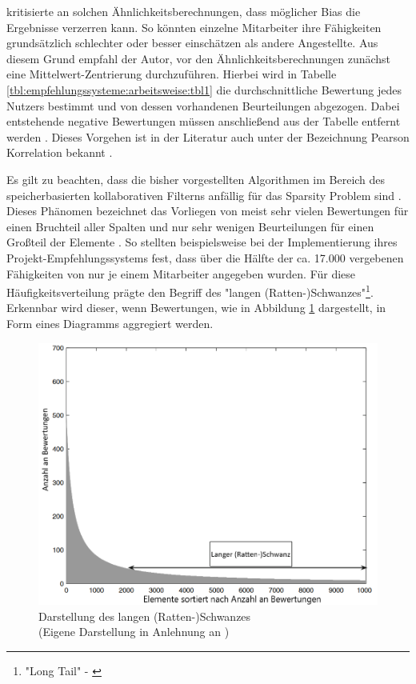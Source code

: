 \textcite[S. 35ff.]{recommenderSystems:2016} kritisierte an solchen Ähnlichkeitsberechnungen, dass möglicher Bias die Ergebnisse verzerren kann. So könnten einzelne Mitarbeiter ihre Fähigkeiten grundsätzlich schlechter oder besser einschätzen als andere Angestellte. Aus diesem Grund empfahl der Autor, vor den Ähnlichkeitsberechnungen zunächst eine Mittelwert-Zentrierung durchzuführen. Hierbei wird in Tabelle \ref{tbl:empfehlungssysteme:arbeitsweise:tbl1} die durchschnittliche Bewertung jedes Nutzers bestimmt und von dessen vorhandenen Beurteilungen abgezogen. Dabei entstehende negative Bewertungen müssen anschließend aus der Tabelle entfernt werden \cite[S. 35ff.]{recommenderSystems:2016}. Dieses Vorgehen ist in der Literatur auch unter der Bezeichnung Pearson Korrelation bekannt \cite[S. 3]{bharti:2019}.

Es gilt zu beachten, dass die bisher vorgestellten Algorithmen im Bereich des speicherbasierten kollaborativen Filterns anfällig für das Sparsity Problem sind \cite[S. 3f.]{grvcar:2006}. Dieses Phänomen bezeichnet das Vorliegen von meist sehr vielen Bewertungen für einen Bruchteil aller Spalten und nur sehr wenigen Beurteilungen für einen Großteil der Elemente \cite[S. 8]{recommenderSystems:2016}. So stellten beispielsweise \textcite[S. 3]{mitre:2014} bei der Implementierung ihres Projekt-Empfehlungssystems fest, dass über die Hälfte der ca. 17.000 vergebenen Fähigkeiten von nur je einem Mitarbeiter angegeben wurden.
Für diese Häufigkeitsverteilung prägte \textcite[S. 11, Z. 32]{anderson:2007} den Begriff des "langen (Ratten-)Schwanzes"\footnote{"Long Tail" - \textcite[S. 11, Z. 32]{anderson:2007}}. Erkennbar wird dieser, wenn Bewertungen, wie in Abbildung \ref{fig:empfehlungssysteme:cf:speicherbasiert:abb1} dargestellt, in Form eines Diagramms aggregiert werden.
\newpage
\begin{figure}[h]
	\centering
	\includegraphics[width=1\textwidth]{gfx/long-tail.png}
	\caption[Darstellung des langen (Ratten-)Schwanzes]{Darstellung des langen (Ratten-)Schwanzes\\
		(Eigene Darstellung in Anlehnung an \cite[S. 33]{recommenderSystems:2016})}
	\label{fig:empfehlungssysteme:cf:speicherbasiert:abb1}
\end{figure}

